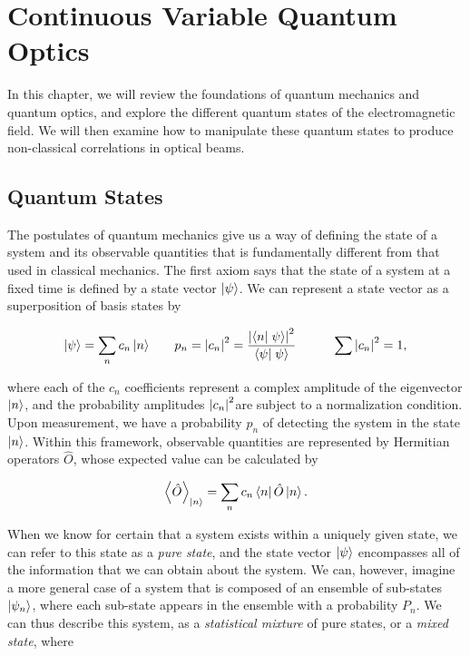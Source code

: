 \chapter{Continuous Variable Quantum Optics}
\label{ch:2}
\minitoc

In this chapter, we will review the foundations of quantum mechanics and
quantum optics, and explore the different quantum states of the
electromagnetic field.  We will then examine how to manipulate these quantum
states to produce non-classical correlations in optical beams.

 
\section{Quantum States}
\label{quantum_states} 

The postulates of quantum mechanics give us a way of
defining the state of a system and its observable quantities that is
fundamentally different from that used in
classical mechanics.  The first axiom
says that the state of a system at a fixed time is defined by a state vector
$\left| \psi \right>$.  We can represent a state vector as a superposition of basis states by 


\begin{eqnarray}
  \label{eq:quantum_state_decomposition}
  \ket{\psi} = \sum_{n} c_{n} \ket{n} \quad & \quad p_n = \abs{c_n}^2 =
\frac{\abs{\braket{n}{\psi}}^2}{\braket{\psi}{\psi}} \quad & \quad \sum \abs{c_n}^2 = 1 ,
\end{eqnarray}

\noindent
where each of the $c_n$ coefficients represent a complex amplitude of the eigenvector $\left| n \right> $, and the probability amplitudes $\left| c_n \right|^2$are subject to a normalization condition.  Upon measurement, we have a probability $p_n$ of detecting the system in the state $\left| n \right>$.  Within this framework, observable quantities are represented by Hermitian operators $\hat{O}$, whose expected value can be calculated by


\begin{equation}
  \label{eq:observable}
  \left< \hat{O} \right>_{\left| n \right>} = \sum_n c_n \left< n \right| \hat{O} \left| n \right>.
\end{equation}


When we know for certain that a system exists within a uniquely given state,
we can refer to this state as a \emph{pure state}, and the state vector
$\left| \psi \right>$ encompasses all of the information that we can obtain about the
system.   We can, however, imagine a more general case of a system that is
composed of an ensemble of sub-states $\left| \psi_n \right>$, where each sub-state
appears in the ensemble with a probability $P_n$.  We can thus describe this
system, as a \emph{statistical mixture} of pure states, or a \emph{mixed
state}, where

